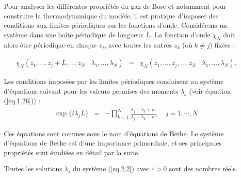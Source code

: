 Pour analyser les différentes propriétés du gaz de Bose et notamment pour construire la thermodynamique du modèle, il est pratique d'imposer des conditions aux limites périodiques sur les fonctions d'onde. Considérons un système dans une boîte périodique de longueur \( L \). La fonction d'onde \( \chi_N \) doit alors être périodique en chaque \( z_j \), avec toutes les autres \( z_k \) (où \( k \neq j \)) fixées :

\begin{eqnarray}
	\chi_N(z_1, \dots, z_j + L, \dots, z_N \mid \lambda_1, \dots, \lambda_N) & = &\chi_N(z_1, \dots, z_j, \dots, z_N \mid \lambda_1, \dots, \lambda_N).
\end{eqnarray}

Les conditions imposées par les limites périodiques conduisent au système d'équations suivant pour les valeurs permises des moments $\lambda_j$ (voir équation (\ref{eq.1.26})) :
\begin{eqnarray}
	\exp \{ i \lambda_j L  \} & = & - \prod_{k =1}^N \frac{ \lambda_j - \lambda_k +ic}{\lambda_j - \lambda_k -ic}, \quad j = 1 , \cdots , N \label{eq.2.2}
\end{eqnarray}

Ces équations sont connues sous le nom d'équations de Bethe. Le système d'équations de Bethe est d'une importance primordiale, et ses principales propriétés sont étudiées en détail par la suite.

\begin{TheoPrinc}
	 Toutes les solutions \( \lambda_j \) du système (\ref{eq.2.2}) avec \( c > 0 \) sont des nombres réels.	
\end{TheoPrinc}

